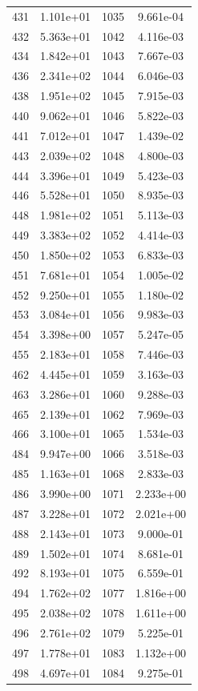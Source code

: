 \documentclass[12pt]{article}
\begin{document}
\begin{longtable}{@{}cccc@{}}
431 & 1.101e+01 & 1035 & 9.661e-04 \\
432 & 5.363e+01 & 1042 & 4.116e-03 \\
434 & 1.842e+01 & 1043 & 7.667e-03 \\
436 & 2.341e+02 & 1044 & 6.046e-03 \\
438 & 1.951e+02 & 1045 & 7.915e-03 \\
440 & 9.062e+01 & 1046 & 5.822e-03 \\
441 & 7.012e+01 & 1047 & 1.439e-02 \\
443 & 2.039e+02 & 1048 & 4.800e-03 \\
444 & 3.396e+01 & 1049 & 5.423e-03 \\
446 & 5.528e+01 & 1050 & 8.935e-03 \\
448 & 1.981e+02 & 1051 & 5.113e-03 \\
449 & 3.383e+02 & 1052 & 4.414e-03 \\
450 & 1.850e+02 & 1053 & 6.833e-03 \\
451 & 7.681e+01 & 1054 & 1.005e-02 \\
452 & 9.250e+01 & 1055 & 1.180e-02 \\
453 & 3.084e+01 & 1056 & 9.983e-03 \\
454 & 3.398e+00 & 1057 & 5.247e-05 \\
455 & 2.183e+01 & 1058 & 7.446e-03 \\
462 & 4.445e+01 & 1059 & 3.163e-03 \\
463 & 3.286e+01 & 1060 & 9.288e-03 \\
465 & 2.139e+01 & 1062 & 7.969e-03 \\
466 & 3.100e+01 & 1065 & 1.534e-03 \\
484 & 9.947e+00 & 1066 & 3.518e-03 \\
485 & 1.163e+01 & 1068 & 2.833e-03 \\
486 & 3.990e+00 & 1071 & 2.233e+00 \\
487 & 3.228e+01 & 1072 & 2.021e+00 \\
488 & 2.143e+01 & 1073 & 9.000e-01 \\
489 & 1.502e+01 & 1074 & 8.681e-01 \\
492 & 8.193e+01 & 1075 & 6.559e-01 \\
494 & 1.762e+02 & 1077 & 1.816e+00 \\
495 & 2.038e+02 & 1078 & 1.611e+00 \\
496 & 2.761e+02 & 1079 & 5.225e-01 \\
497 & 1.778e+01 & 1083 & 1.132e+00 \\
498 & 4.697e+01 & 1084 & 9.275e-01 \\

\end{longtable}
\end{document}
